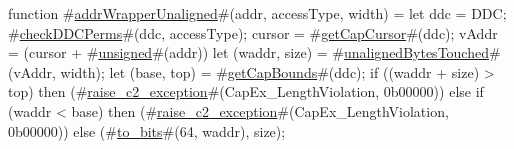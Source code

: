 function #\hyperref[zaddrWrapperUnaligned]{addrWrapperUnaligned}#(addr, accessType, width) =
  {
    let ddc = DDC;
    #\hyperref[zcheckDDCPerms]{checkDDCPerms}#(ddc, accessType);
    cursor = #\hyperref[zgetCapCursor]{getCapCursor}#(ddc);
    vAddr  = (cursor + #\hyperref[zunsigned]{unsigned}#(addr)) %
    let (waddr, size) = #\hyperref[zunalignedBytesTouched]{unalignedBytesTouched}#(vAddr, width);
    let (base, top) = #\hyperref[zgetCapBounds]{getCapBounds}#(ddc);
    if ((waddr + size) > top) then
      (#\hyperref[zraisezyc2zyexception]{raise\_c2\_exception}#(CapEx_LengthViolation, 0b00000))
    else if (waddr < base) then
      (#\hyperref[zraisezyc2zyexception]{raise\_c2\_exception}#(CapEx_LengthViolation, 0b00000))
    else
      (#\hyperref[ztozybits]{to\_bits}#(64, waddr), size);
  }
